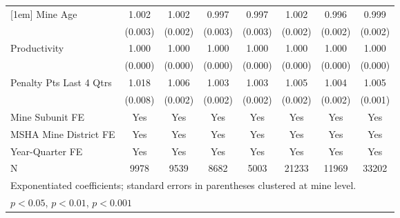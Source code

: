 {\begin{tabular}{l*{7}{c}}
[1em]
Mine Age                 &       1.002         &       1.002         &       0.997         &       0.997         &       1.002         &       0.996         &       0.999         \\
                         &     (0.003)         &     (0.002)         &     (0.003)         &     (0.003)         &     (0.002)         &     (0.002)         &     (0.002)         \\
[1em]
Productivity             &       1.000         &       1.000         &       1.000         &       1.000         &       1.000         &       1.000         &       1.000         \\
                         &     (0.000)         &     (0.000)         &     (0.000)         &     (0.000)         &     (0.000)         &     (0.000)         &     (0.000)         \\
[1em]
Penalty Pts Last 4 Qtrs  &       1.018\sym{*}  &       1.006\sym{***}&       1.003         &       1.003         &       1.005\sym{***}&       1.004\sym{*}  &       1.005\sym{***}\\
                         &     (0.008)         &     (0.002)         &     (0.002)         &     (0.002)         &     (0.002)         &     (0.002)         &     (0.001)         \\
[1em]
Mine Subunit FE          &         Yes         &         Yes         &         Yes         &         Yes         &         Yes         &         Yes         &         Yes         \\
[1em]
MSHA Mine District FE    &         Yes         &         Yes         &         Yes         &         Yes         &         Yes         &         Yes         &         Yes         \\
[1em]
Year-Quarter FE          &         Yes         &         Yes         &         Yes         &         Yes         &         Yes         &         Yes         &         Yes         \\
\hline
N                        &        9978         &        9539         &        8682         &        5003         &       21233         &       11969         &       33202         \\
\hline\hline
\multicolumn{8}{l}{\footnotesize Exponentiated coefficients; standard errors in parentheses clustered at mine level.}\\
\multicolumn{8}{l}{\footnotesize \sym{*} \(p<0.05\), \sym{**} \(p<0.01\), \sym{***} \(p<0.001\)}\\
\end{tabular}
}
